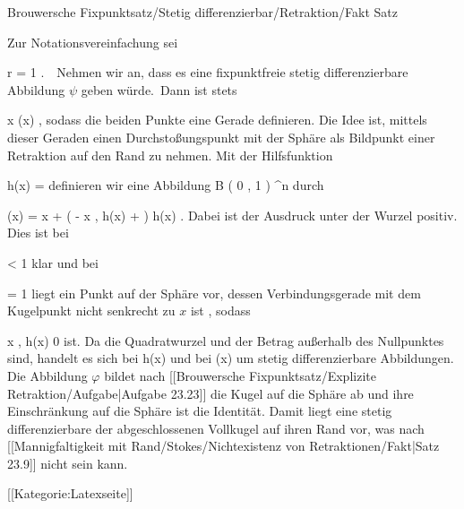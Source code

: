 {Brouwersche Fixpunktsatz/Stetig differenzierbar/Retraktion/Fakt}
{Satz}
{}
{

\faktzusatz {}
\faktzusatz {}

}
{

Zur Notationsvereinfachung sei

\mavergleichskette
{\vergleichskette
{ r
}
{ = }{ 1
}
{  }{
}
{    }{
}
{   }{
}
}
{}{}{.}  Nehmen wir an, dass es eine fixpunktfreie stetig differenzierbare Abbildung $\psi$ geben würde. Dann ist stets

\mavergleichskettedisp
{\vergleichskette
{ x
}
{ \neq} { \psi(x)
}
{ } {
}
{ } {
}
{ } {
}
}
{}{}{,}
sodass die beiden Punkte eine Gerade definieren. Die Idee ist, mittels dieser Geraden einen
 {} {}
Durchstoßungspunkt mit der Sphäre als Bildpunkt einer Retraktion auf den Rand zu nehmen. Mit der Hilfsfunktion

\mavergleichskettedisp
{\vergleichskette
{ h(x)
}
{ =} { {  }
}
{ } {
}
{ } {
}
{ } {
}
}
{}{}{}
definieren wir eine Abbildung
\maabbdisp {\varphi} { B  \left(  0 , 1 \right) } { \R^n
} {}
durch

\mavergleichskettedisphandlinks
{\vergleichskettedisphandlinks
{ \varphi(x)
}
{ =} { x + \left(  - \left\langle  x  , h(x)  \right\rangle +   \right) \cdot h(x)
}
{ } {
}
{ } {
}
{ } {
}
}
{}{}{.}
Dabei ist der Ausdruck unter der Wurzel positiv. Dies ist bei

\mavergleichskette
{\vergleichskette
{  \Vert
}
{ < }{ 1
}
{  }{
}
{    }{
}
{   }{
}
}
{}{}{}
klar und bei

\mavergleichskette
{\vergleichskette
{  \Vert
}
{ = }{ 1
}
{  }{
}
{    }{
}
{   }{
}
}
{}{}{}
liegt ein Punkt auf der Sphäre vor, dessen Verbindungsgerade mit dem Kugelpunkt
 nicht senkrecht zu $x$ ist
 {} {,}
sodass

\mavergleichskettedisp
{\vergleichskette
{ \left\langle  x  , h(x)  \right\rangle
}
{ \neq} { 0
}
{ } {
}
{ } {
}
{ } {
}
}
{}{}{}
ist. Da die Quadratwurzel und der Betrag außerhalb des Nullpunktes
sind, handelt es sich bei
\mathkor {} {h(x)} {und bei} {\varphi(x)} {}
um stetig differenzierbare Abbildungen. Die Abbildung $\varphi$ bildet nach
[[Brouwersche Fixpunktsatz/Explizite Retraktion/Aufgabe|Aufgabe 23.23]]
die Kugel auf die Sphäre ab und ihre Einschränkung auf die Sphäre ist die Identität. Damit liegt eine stetig differenzierbare
der abgeschlossenen Vollkugel auf ihren Rand vor, was nach
[[Mannigfaltigkeit mit Rand/Stokes/Nichtexistenz von Retraktionen/Fakt|Satz 23.9]]
nicht sein kann.

}

 [[Kategorie:Latexseite]]
